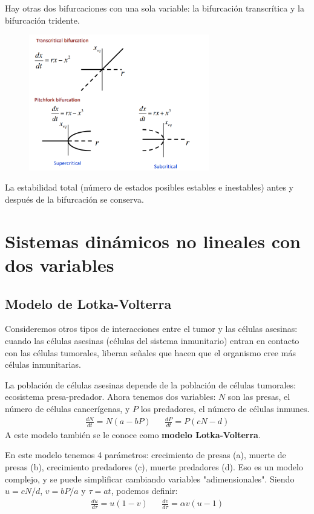 Hay otras dos bifurcaciones con una sola variable: la bifurcación transcrítica y la bifurcación tridente.
\begin{figure}[h]
\centering
\includegraphics[width = 0.7\textwidth]{figs/bifurcacion-normal.png}
\end{figure}

La estabilidad total (número de estados posibles estables e inestables) antes y después de la bifurcación se conserva. 

\section{Sistemas dinámicos no lineales con dos variables}
\subsection{Modelo de Lotka-Volterra}
Consideremos otros tipos de interacciones entre el tumor y las células asesinas: cuando las células asesinas (células del sistema inmunitario) entran en contacto con las células tumorales, liberan señales que hacen que el organismo cree más células inmunitarias. 

La población de células asesinas depende de la población de células tumorales: ecosistema presa-predador. Ahora tenemos dos variables: $N$ son las presas, el número de células cancerígenas, y $P$ los predadores, el número de células inmunes. 
\begin{align*}
\frac{dN}{dt} = N(a - bP) && \frac{dP}{dt} = P(cN - d)
\end{align*}
A este modelo también se le conoce como \textbf{modelo Lotka-Volterra}. 

En este modelo tenemos 4 parámetros: crecimiento de presas (a), muerte de presas (b), crecimiento predadores (c), muerte predadores (d). Eso es un modelo complejo, y se puede simplificar cambiando variables "adimensionales". Siendo $u = cN/d$, $v = bP/a$ y $\tau = at$, podemos definir:
\begin{align*}
\frac{du}{d\tau} = u(1 - v) && \frac{dv}{d\tau} = \alpha v(u - 1)
\end{align*}


